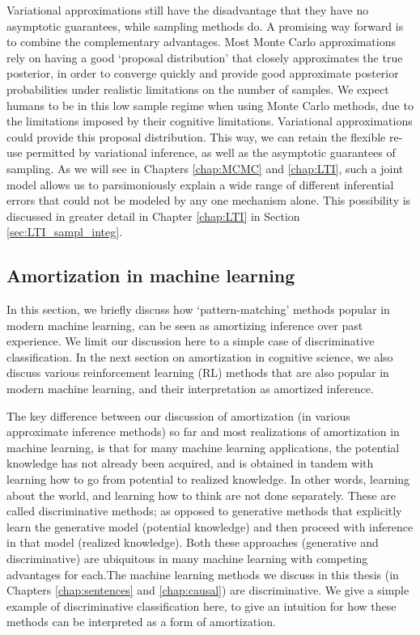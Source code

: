 Variational approximations still have the disadvantage that they have no asymptotic guarantees, while sampling methods do. A promising way forward is to combine the complementary advantages. Most Monte Carlo approximations rely on having a good `proposal distribution' that closely approximates the true posterior, in order to converge quickly and provide good approximate posterior probabilities under realistic limitations on the number of samples. We expect humans to be in this low sample regime when using Monte Carlo methods, due to the limitations imposed by their cognitive limitations. Variational approximations could provide this proposal distribution. This way, we can retain the flexible re-use permitted by variational inference, as well as the asymptotic guarantees of sampling. As we will see in Chapters \ref{chap:MCMC} and \ref{chap:LTI}, such a joint model allows us to parsimoniously explain a wide range of different inferential errors that could not be modeled by any one mechanism alone. This possibility is discussed in greater detail in Chapter \ref{chap:LTI} in Section \ref{sec:LTI_sampl_integ}.

\subsection{Amortization in machine learning}

In this section, we briefly discuss how `pattern-matching' methods popular in modern machine learning, can be seen as amortizing inference over past experience. We limit our discussion here to a simple case of discriminative classification. In the next section on amortization in cognitive science, we also discuss various reinforcement learning (RL) methods that are also popular in modern machine learning, and their interpretation as amortized inference.

The key difference between our discussion of amortization (in various approximate inference methods) so far and most realizations of amortization in machine learning, is that for many machine learning applications, the potential knowledge has not already been acquired, and is obtained in tandem with learning how to go from potential to realized knowledge. In other words, learning about the world, and learning how to think are not done separately. These are called discriminative methods; as opposed to generative methods that explicitly learn the generative model (potential knowledge) and then proceed with inference in that model (realized knowledge). Both these approaches (generative and discriminative) are ubiquitous in many machine learning with competing advantages for each\citep{ng2002discriminative, lasserre2006principled}.The machine learning methods we discuss in this thesis (in Chapters \ref{chap:sentences} and \ref{chap:causal}) are discriminative. We give a simple example of discriminative classification here, to give an intuition for how these methods can be interpreted as a form of amortization.

